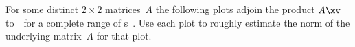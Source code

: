 





\sectionExercises


\begin{exercise}  
For some distinct \(2\times2\) matrices~\(A\) the following plots adjoin the product \(A\xv\) to~\xv\ for a complete range of s~\xv.
Use each plot to roughly estimate the norm of the underlying matrix~\(A\) for that plot.
\begin{Parts}
\item {}
\item {}
\item {}
\item {}
\begin{reduce}
\item {}
\item {}
\end{reduce}
\end{Parts}
\end{exercise}


